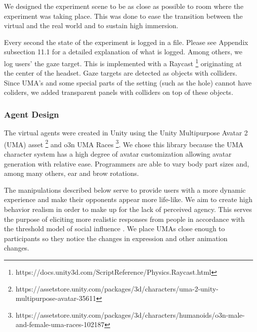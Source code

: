 We designed the experiment scene to be as close as possible to room where the experiment was taking place. This was done to ease the transition between the virtual and the real world and to sustain high immersion. 

Every second the state of the experiment is logged in a file. Please see Appendix subsection 11.1 for a detailed explanation of what is logged. Among others, we log users' the gaze target. This is implemented with a Raycast \footnote{https://docs.unity3d.com/ScriptReference/Physics.Raycast.html} originating at the center of the headset. Gaze targets are detected as objects with colliders. Since UMA's and some special parts of the setting (such as the hole) cannot have coliders, we added transparent panels with colliders on top of these objects.


\subsubsection{Agent Design}
\label{section:AgentDesign}

The virtual agents were created in Unity using the Unity Multipurpose Avatar 2 (UMA) asset \footnote{https://assetstore.unity.com/packages/3d/characters/uma-2-unity-multipurpose-avatar-35611} and o3n UMA Races \footnote{https://assetstore.unity.com/packages/3d/characters/humanoids/o3n-male-and-female-uma-races-102187}. We chose this library because the UMA character system has a high degree of avatar customization allowing avatar generation with relative ease. Programmers are able to vary body part sizes and, among many others, ear and brow rotations. 

The manipulations described below serve to provide users with a more dynamic experience and make their opponents appear more life-like. We aim to create high behavior realism in order to make up for the lack of perceived agency. This serves the purpose of eliciting more realistic responses from people in accordance with the threshold model of social influence \cite{blascovich2002theoretical}. We place UMAs close enough to participants so they notice the changes in expression and other animation changes.

